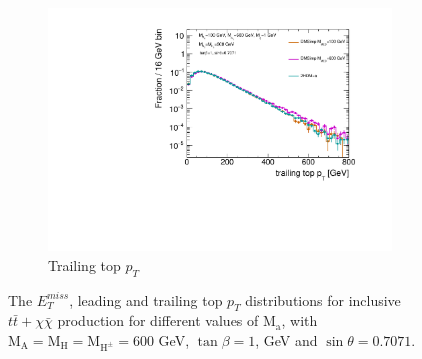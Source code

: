 \begin{figure}
\begin{subfigure}[b]{0.49\textwidth}
    \includegraphics[width=\textwidth]{texinputs/04_grid/figures/DMHF/benchmarking/MDM_1_Ma_100_MA_600_sinp_0.7071_tanb_1.0_VS_DMSimp_100_600_Decayed/top2ptlog.pdf}
    \caption{Trailing top $p_{T}$}
  \end{subfigure}
  \caption{The $E_{T}^{miss}$, leading and trailing top $p_{T}$ distributions for inclusive $t\bar{t}+\chi\bar{\chi}$ production for different values of $\mathrm{M_a}$, with $\mathrm{M_A}=\mathrm{M_H}=\mathrm{M_{H^{\pm}}}=600$ GeV, $\tan\beta=1$,  GeV and $\sin\theta=0.7071$.}
  \label{fig:kin_DMSimpV2HDMa}
\end{figure}


